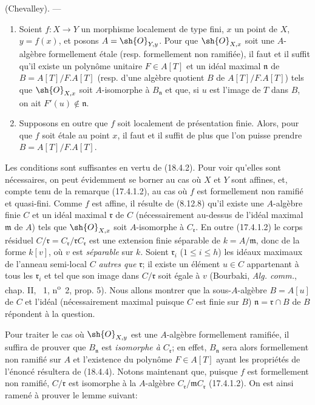 \begin{theorem}[18.4.6]
\label{IV.18.4.6}
(Chevalley). ---
\begin{enumerate}
  \item[\textup{(i)}] Soient $f:X\to Y$ un morphisme localement de type fini, $x$ un point de $X$, $y=f(x)$, et posons $A=\sh{O}_{Y,y}$. Pour que $\sh{O}_{X,x}$ soit une $A$-algèbre formellement étale \textup{(resp.} formellement non ramifiée\textup{)}, il faut et il suffit qu'il existe un polynôme unitaire $F\in A[T]$ et un idéal maximal $\mathfrak n$ de $B=A[T]/F.A[T]$ \textup{(resp.} d'une algèbre quotient $B$ de $A[T]/F.A[T]$\textup{)} tels que $\sh{O}_{X,x}$ soit $A$-isomorphe à $B_{\mathfrak n}$ et que, si $u$ est l'image de $T$ dans $B$, on ait $F'(u)\notin\mathfrak n$.
  \item[\textup{(ii)}] Supposons en outre que $f$ soit localement de présentation finie. Alors, pour que $f$ soit étale au point $x$, il faut et il suffit de plus que l'on puisse prendre $B=A[T]/F.A[T]$.
\end{enumerate}
\end{theorem}

Les conditions sont suffisantes en vertu de (18.4.2). Pour voir qu'elles sont nécessaires, on peut évidemment se borner au cas où $X$ et $Y$ sont affines, et, compte tenu de la remarque (17.4.1.2), au cas où $f$ est formellement non ramifié et quasi-fini. Comme $f$ est affine, il résulte de (8.12.8) qu'il existe une $A$-algèbre finie $C$ et un idéal maximal $\mathfrak r$ de $C$ (nécessairement au-dessus de l'idéal maximal $\mathfrak m$ de $A$) tels que $\sh{O}_{X,x}$ soit $A$-isomorphe à $C_{\mathfrak r}$. En outre (17.4.1.2) le corps résiduel $C/\mathfrak r=C_{\mathfrak r}/\mathfrak rC_{\mathfrak r}$ est une extension finie séparable de $k=A/\mathfrak m$, donc de la forme $k[v]$, où $v$ est \emph{séparable} sur $k$. Soient $\mathfrak r_i$ ($1\leq i\leq h$) les idéaux maximaux de l'anneau semi-local $C$ \emph{autres que} $\mathfrak r$; il existe un élément $u\in C$ appartenant à tous les $\mathfrak r_i$ et tel que son image dans $C/\mathfrak r$ soit égale à $v$ (Bourbaki, \emph{Alg. comm.}, chap. II, \textsection~1, n\textsuperscript{o}~2, prop. 5). Nous allons montrer que la sous-$A$-algèbre $B=A[u]$ de $C$ et l'idéal (nécessairement maximal puisque $C$ est finie sur $B$) $\mathfrak n=\mathfrak r\cap B$ de $B$ répondent à la question.

Pour traiter le cas où $\sh{O}_{X,y}$ est une $A$-algèbre formellement ramifiée, il suffira de prouver que $B_{\mathfrak n}$ est \emph{isomorphe à} $C_{\mathfrak r}$; en effet, $B_{\mathfrak n}$ sera alors formellement non ramifié sur $A$ et l'existence du polynôme $F\in A[T]$ ayant les propriétés de l'énoncé résultera de (18.4.4). Notons maintenant que, puisque $f$ est formellement non ramifié, $C/\mathfrak r$ est isomorphe à la $A$-algèbre $C_{\mathfrak r}/\mathfrak mC_{\mathfrak r}$ (17.4.1.2). On est ainsi ramené à prouver le lemme suivant:

